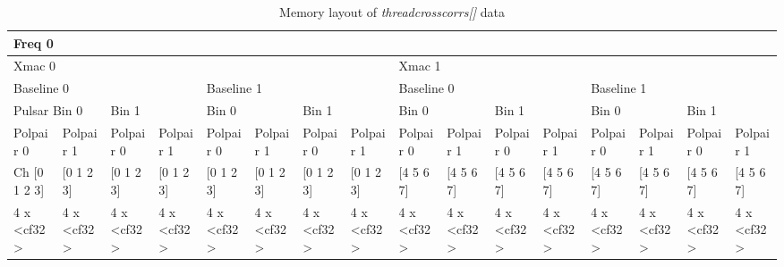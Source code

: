 \begin{table}[!htp]
\caption{Memory layout of {\em threadcrosscorrs[]} data\label{tab:A.threadcrosscorrs}}
\begin{tabular}{|l|l|l|l|l|l|l|l|l|l|l|l|l|l|l|l|}
\hline
\multicolumn{16}{|l|}{Freq 0} \\
\hline
\multicolumn{8}{|l|}{Xmac 0} & \multicolumn{8}{l|}{Xmac 1} \\
\hline
\multicolumn{4}{|l|}{Baseline 0} & \multicolumn{4}{l|}{Baseline 1} & \multicolumn{4}{l|}{Baseline 0} & \multicolumn{4}{l|}{Baseline 1} \\
\hline
\multicolumn{2}{|l|}{\small{Pulsar Bin 0}} & \multicolumn{2}{l|}{\small{Bin 1}} &
\multicolumn{2}{l|}{\small{Bin 0}} & \multicolumn{2}{l|}{\small{Bin 1}} &
\multicolumn{2}{l|}{\small{Bin 0}} & \multicolumn{2}{l|}{\small{Bin 1}} &
\multicolumn{2}{l|}{\small{Bin 0}} & \multicolumn{2}{l|}{\small{Bin 1}}
\\
\hline
\footnotesize {Polpair 0} & \footnotesize {Polpair 1} &  \footnotesize {Polpair 0} & \footnotesize {Polpair 1} & 
\footnotesize {Polpair 0} & \footnotesize {Polpair 1} &  \footnotesize {Polpair 0} & \footnotesize {Polpair 1} &
\footnotesize {Polpair 0} & \footnotesize {Polpair 1} &  \footnotesize {Polpair 0} & \footnotesize {Polpair 1} & 
\footnotesize {Polpair 0} & \footnotesize {Polpair 1} &  \footnotesize {Polpair 0} & \footnotesize {Polpair 1} \\
\hline
\scriptsize {Ch [0 1 2 3]} & \scriptsize {[0 1 2 3]} & \scriptsize {[0 1 2 3]} & \scriptsize {[0 1 2 3]} &
\scriptsize {[0 1 2 3]} & \scriptsize {[0 1 2 3]} & \scriptsize {[0 1 2 3]} & \scriptsize {[0 1 2 3]} &
\scriptsize {[4 5 6 7]} & \scriptsize {[4 5 6 7]} & \scriptsize {[4 5 6 7]} & \scriptsize {[4 5 6 7]} &
\scriptsize {[4 5 6 7]} & \scriptsize {[4 5 6 7]} & \scriptsize {[4 5 6 7]} & \scriptsize {[4 5 6 7]} \\
\hline
\tiny{4 x \textless{}cf32\textgreater{}} & \tiny{4 x \textless{}cf32\textgreater{}} & \tiny{4 x \textless{}cf32\textgreater{}} & \tiny{4 x \textless{}cf32\textgreater{}} & 
\tiny{4 x \textless{}cf32\textgreater{}} & \tiny{4 x \textless{}cf32\textgreater{}} & \tiny{4 x \textless{}cf32\textgreater{}} & \tiny{4 x \textless{}cf32\textgreater{}} & 
\tiny{4 x \textless{}cf32\textgreater{}} & \tiny{4 x \textless{}cf32\textgreater{}} & \tiny{4 x \textless{}cf32\textgreater{}} & \tiny{4 x \textless{}cf32\textgreater{}} & 
\tiny{4 x \textless{}cf32\textgreater{}} & \tiny{4 x \textless{}cf32\textgreater{}} & \tiny{4 x \textless{}cf32\textgreater{}} & \tiny{4 x \textless{}cf32\textgreater{}} \\
\hline
\end{tabular}
\end{table}

